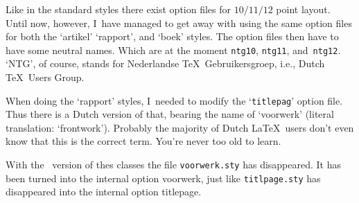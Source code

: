 \documentclass[a4paper,10pt]{artikel1} %
\newcommand\Lopt[1]{\textsf{#1}}
\newcommand\file[1]{\texttt{#1}}
\begin{document}
Like in the standard styles there exist option files for $10/11/12$
point layout. Until now, however, I~have managed to get away with
using the same option files for both the `artikel' `rapport', and
`boek' styles.  The option files then have to have some neutral names.
Which are at the moment \file{ntg10}, \file{ntg11},
and~\file{ntg12}. `NTG', of course, stands for Nederlandse \TeX\ 
Gebruikersgroep, i.e., Dutch \TeX\ Users Group.

When doing the `rapport' styles, I~needed to modify the `\file{titlepag}'
option file. Thus there is a Dutch version of that, bearing the name
of `voorwerk' (literal translation: `frontwork').  Probably the
majority of Dutch \LaTeX\ users don't even know that this is the
correct term.  You're never too old to learn.

With the \LaTeXe\ version of thes classes the file \file{voorwerk.sty}
has disappeared. It has been turned into the internal option
\Lopt{voorwerk}, just like \file{titlpage.sty} has disappeared into
the internal option \Lopt{titlepage}.
\end{document}

